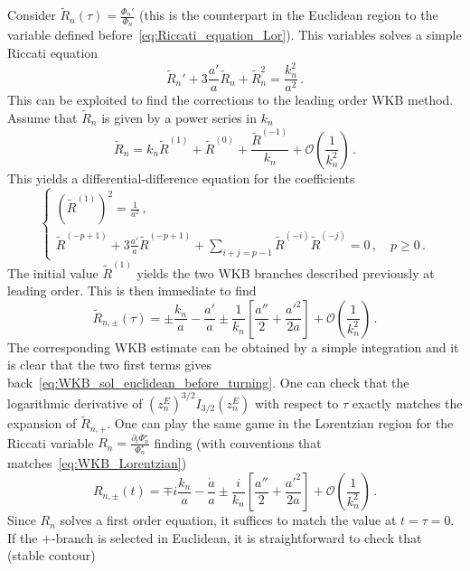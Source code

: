 \documentclass[a4paper,11pt]{article}
\begin{document}
Consider $\tilde{R}_n(\tau)= \frac{\Phi_n'}{\Phi_n}$ (this is the counterpart in the Euclidean region to the variable defined before~\eqref{eq:Riccati_equation_Lor}). This variables solves a simple Riccati equation
\begin{equation}\label{eq:Riccati_euclidean}
    \tilde{R}_n' + 3\frac{a'}{a}\tilde{R}_n + \tilde{R}_n^2 = \frac{k_n^2}{a^2}\,.
\end{equation}
This can be exploited to find the corrections to the leading order WKB method. Assume that $\tilde{R}_n$ is given by a power series in $k_n$
\begin{equation}
    \tilde{R}_n = k_n \tilde{R}^{(1)} + \tilde{R}^{(0)} + \frac{\tilde{R}^{(-1)}}{k_n} + \mathcal{O}\left(\frac{1}{k^2_n}\right)\,.
\end{equation}
This yields a differential-difference equation for the coefficients
\begin{equation}
\begin{cases}
     \left(\tilde{R}^{(1)}\right)^2 = \frac{1}{a^2} \,,
     \\[0.3cm]
     \tilde{R}^{(-p+1)} + 3 \frac{a'}{a}\tilde{R}^{(-p+1)} + \sum_{i+j=p-1} \tilde{R}^{(-i)}\tilde{R}^{(-j)}= 0\,, \quad p\geq0\,.
\end{cases}
\end{equation}
The initial value $\tilde{R}^{(1)}$ yields the two WKB branches described previously at leading order. This is then immediate to find
\begin{equation}
    \tilde{R}_{n,\pm}(\tau) = \pm\frac{k_n}{a} - \frac{a'}{a}\pm\frac{1}{k_n}\left[\frac{a''}{2}+\frac{a'^2}{2a}\right] + \mathcal{O}\left(\frac{1}{k_n^2}\right)\,.
\end{equation}
The corresponding WKB estimate can be obtained by a simple integration and it is clear that the two first terms gives back~\eqref{eq:WKB_sol_euclidean_before_turning}. 
One can check that the logarithmic derivative of $(z_n^E)^{3/2}I_{3/2}(z_n^E)$ with respect to $\tau$ exactly matches the expansion of $\tilde{R}_{n,+}$.
One can play the same game in the Lorentzian region for the Riccati variable $R_n = \frac{\partial_t \Phi^\star_n}{\Phi^\star_n}$ finding (with conventions that matches~\eqref{eq:WKB_Lorentzian})
\begin{equation}
    R_{n,\pm}(t) = \mp i\frac{k_n}{a}-\frac{\dot{a}}{a} \pm \frac{i}{k_n}\left[\frac{a''}{2}+\frac{a'^2}{2a}\right]+ \mathcal{O}\left(\frac{1}{k_n^2}\right)\,.
\end{equation}
Since $R_n$ solves a first order equation, it suffices to match the value at $t=\tau=0$. If the $+$-branch is selected in Euclidean, it is straightforward to check that (stable contour)
\end{document}
